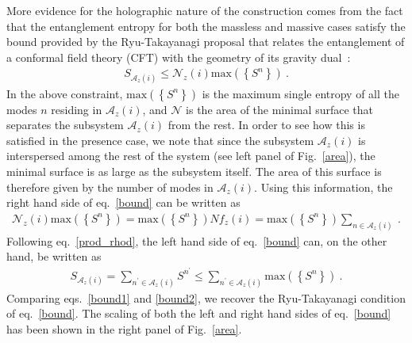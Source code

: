More evidence for the holographic nature of the construction comes from the fact that the entanglement entropy for both the massless and massive cases satisfy the bound provided by the Ryu-Takayanagi proposal that relates the entanglement of a conformal field theory (CFT) with the geometry of its gravity dual~\cite{ryu2006,ryu2006aspects}:
\begin{equation}\begin{aligned}
	\label{bound}
	S_{\mathcal{A}_{z}(i)} \leq \mathcal{N}_{z}(i) \text{max}\left(\left\{ S^n \right\}\right) ~.
\end{aligned}\end{equation}
In the above constraint, \(\text{max}\left(\left\{ S^n \right\}\right)\) is the maximum single entropy of all the modes \(n\) residing in \(\mathcal{A}_{z}(i)\), and \(\mathcal{N}\) is the area of the minimal surface that separates the subsystem \(\mathcal{A}_{z}(i)\) from the rest.
In order to see how this is satisfied in the presence case, we note that since the subsystem \(\mathcal{A}_{z}(i)\) is interspersed among the rest of the system (see left panel of Fig.~\ref{area}), the minimal surface is as large as the subsystem itself.
The area of this surface is therefore given by the number of modes in \(\mathcal{A}_{z}(i)\).
Using this information, the right hand side of eq.~\eqref{bound} can be written as
\begin{equation}\begin{aligned}
	\label{bound1}
	\mathcal{N}_{z}(i) \text{max}\left(\left\{ S^n \right\}\right) = \text{max}\left(\left\{ S^n \right\}\right) N f_{z}(i) = \text{max}\left(\left\{ S^n \right\}\right) \sum_{n \in \mathcal{A}_{z}(i)}~.
\end{aligned}\end{equation}
Following eq.~\eqref{prod_rhod}, the left hand side of eq.~\eqref{bound} can, on the other hand, be written as
\begin{equation}\begin{aligned}
	\label{bound2}
	S_{\mathcal{A}_{z}(i)} = \sum_{n^\prime \in \mathcal{A}_{z}(i)} S^{n^\prime} \leq \sum_{n^\prime \in \mathcal{A}_{z}(i)} \text{max}\left(\left\{S^{n}\right\}\right)~.
\end{aligned}\end{equation}
Comparing eqs.~\eqref{bound1} and \eqref{bound2}, we recover the Ryu-Takayanagi condition of eq.~\eqref{bound}. The scaling of both the left and right hand sides of eq.~\eqref{bound} has been shown in the right panel of Fig.~\ref{area}.

